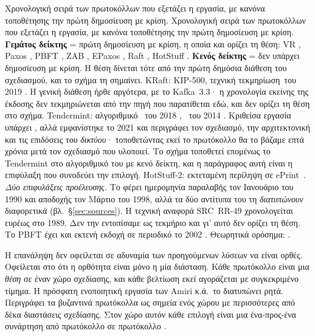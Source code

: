 %
{Χρονολογική σειρά των πρωτοκόλλων που εξετάζει η εργασία, με κανόνα
τοποθέτησης την πρώτη δημοσίευση με κρίση.}%
{Χρονολογική σειρά των πρωτοκόλλων που εξετάζει η εργασία, με κανόνα
τοποθέτησης την πρώτη δημοσίευση με κρίση. \textbf{Γεμάτος δείκτης} =
πρώτη δημοσίευση με κρίση, η οποία και ορίζει τη θέση: VR
\cite{oki1988viewstamped}, Paxos \cite{lamport1998parttime}, PBFT
\cite{castro1999pbft}, ZAB \cite{junqueira2011zab}, EPaxos
\cite{moraru2013epaxos}, Raft \cite{ongaro2014raft}, HotStuff
\cite{yin2019hotstuff}. \textbf{Κενός δείκτης} = δεν υπάρχει δημοσίευση
με κρίση. Η θέση δίνεται τότε από την πρώτη δημόσια διάθεση του
σχεδιασμού, και το σχήμα τη σημαίνει. KRaft: KIP-500, τεχνική
τεκμηρίωση\grey\ του 2019 \cite{kafka2019kip500}. Η γενική διάθεση ήρθε
αργότερα, με το Kafka~3.3· η χρονολογία εκείνης της έκδοσης δεν
τεκμηριώνεται από την πηγή που παρατίθεται εδώ, και δεν ορίζει τη θέση
στο σχήμα. Tendermint: αλγοριθμικό \prep\ του
2018 \cite{buchman2018gossip}, \grey\ του 2014
\cite{kwon2014tendermint}. Κριθείσα εργασία υπάρχει
\cite{cason2021tendermint}, αλλά εμφανίστηκε το 2021 και περιγράφει τον
σχεδιασμό, την αρχιτεκτονική και τις επιδόσεις του \emph{δικτύου}·
τοποθετώντας εκεί το πρωτόκολλο θα το βάζαμε επτά χρόνια μετά τον
σχεδιασμό που υλοποιεί. Το σχήμα τοποθετεί επομένως το Tendermint στο
αλγοριθμικό του  με κενό δείκτη, και η παράγραφος αυτή
είναι η επιφύλαξη που συνοδεύει την επιλογή. HotStuff-2: εκτεταμένη
περίληψη σε ePrint\prep\ \cite{malkhi2023hotstuff2}. \emph{Δύο
επιφυλάξεις προέλευσης.} Το \cite{lamport1998parttime} φέρει ημερομηνία
παραλαβής τον Ιανουάριο του 1990 και αποδοχής τον Μάρτιο του 1998, αλλά
τα δύο αντίτυπα του  τη \emph{διατυπώνουν} διαφορετικά (βλ.\
\S\ref{sec:sources}). Η τεχνική αναφορά SRC~RR-49 χρονολογείται ευρέως
στο 1989. Δεν την εντοπίσαμε ως τεκμήριο και γι' αυτό δεν ορίζει τη θέση.
Το PBFT έχει και εκτενή εκδοχή σε περιοδικό το 2002
\cite{castro2002pbftrecovery}. Θεωρητικά ορόσημα:
\cite{lamport1978time,lamport1982byzantine,fischer1985impossibility,%
dwork1988consensus,schneider1990implementing,herlihy1990linearizability}.}%
{}

Η επανάληψη δεν οφείλεται σε αδυναμία των προηγούμενων λύσεων να είναι
ορθές. Οφείλεται στο ότι η ορθότητα είναι μόνο η μία διάσταση. Κάθε
πρωτόκολλο είναι μια \emph{θέση} σε έναν χώρο σχεδίασης, και κάθε
βελτίωση εκεί αγοράζεται με συγκεκριμένο τίμημα. Η πρόσφατη ενοποιητική
εργασία των Amiri κ.ά.\ το διατυπώνει ρητά. Περιγράφει τα βυζαντινά
πρωτόκολλα ως σημεία ενός χώρου με περισσότερες από δέκα διαστάσεις
σχεδίασης. Στον χώρο αυτόν κάθε επιλογή είναι μια ένα-προς-ένα
συνάρτηση από πρωτόκολλο σε πρωτόκολλο \cite{amiri2024bedrock}.


